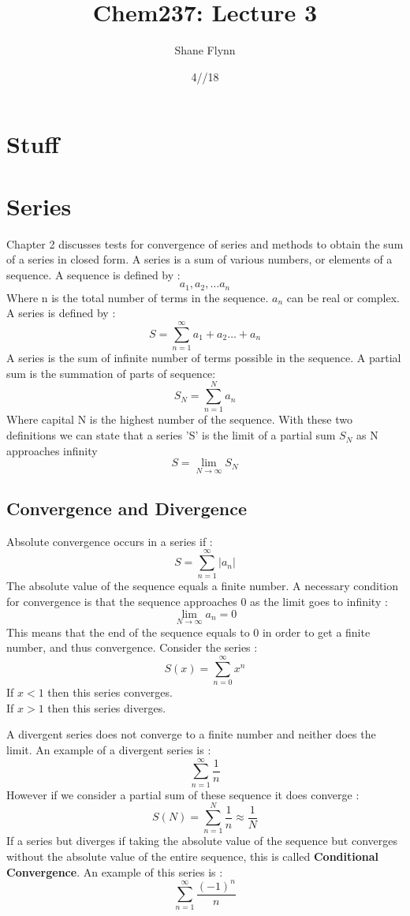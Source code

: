 \documentclass{article}
\title{Chem237: Lecture 3}
\date{4//18}
\author{Shane Flynn}
\newcommand{\be}{\begin{equation}}
\newcommand{\ee}{\end{equation}}
\begin{document}
\maketitle
\section*{Stuff}
\section*{Series}
 Chapter 2 discusses tests for convergence of series and methods to obtain the sum of a series in closed form.
 A series is a sum of various numbers, or elements of a sequence. A sequence is defined by :
 \be
  a_1, a_2, \hdots a_n
 \ee
 Where n is the total number of terms in the sequence.
 $a_n$ can be real or complex.
A series is defined by :
\be
S=\sum_{n=1}^{\infty}a_1 + a_2 \hdots + a_n
\ee
A series is the sum of infinite number of terms possible in the sequence.
A partial sum is the summation of parts of sequence:
\be
S_N = \sum_{n=1}^{N} a_n
\ee
Where capital N is the highest number of the sequence.
With these two definitions we can state that a series 'S' is the limit of a partial sum $S_N$ as N approaches infinity
\be
S = \lim_{N \to \infty}{S_N}
\ee
\subsection*{Convergence and Divergence}
Absolute convergence occurs in a series if :
\be
S= \sum_{n=1}^{\infty} |a_n|
\ee
The absolute value of the sequence equals a finite number.
A necessary condition for convergence is that the sequence approaches 0 as the limit goes to infinity :
\be
\lim_{N \to \infty} a_n = 0
\ee
This means that the end of the sequence equals to 0 in order to get a finite number, and thus convergence.
\bigskip
Consider the series :
\be
S(x) = \sum_{n=0}^\infty x^n
\ee
If $x<1$ then this series converges. \\
If $x>1$ then this series diverges.

A divergent series does not converge to a finite number and neither does the limit.
An example of a divergent series is :
\be
\sum_{n=1}^{\infty} \frac{1}{n}
\ee
However if we consider a partial sum of these sequence it does converge :
\be
S(N) = \sum_{n=1}^{N} \frac{1}{n} \approx \frac{1}{N}
\ee
If a series but diverges if taking the absolute value of the sequence but converges without the absolute value of the entire sequence, this is called \textbf{Conditional Convergence}.
An example of this series is :
\be
\sum_{n=1}^{\infty}\frac{(-1)^n}{n}
\ee
\end{document}
